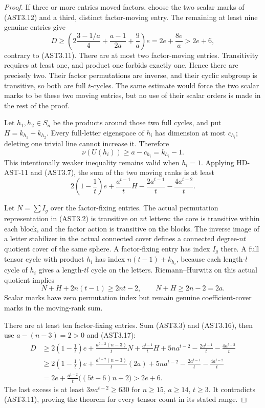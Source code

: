 \begin{proof}
If three or more entries moved factors, choose the two scalar
marks of (AST3.12) and a third, distinct factor-moving entry.
The remaining at least nine genuine entries give
\[
 D\ge\left(2\frac{3-1/a}{4}+\frac{a-1}{2a}
                         +\frac9a\right)e
       =2e+\frac{8e}{a}>2e+6,                               \tag{AST3.14}
\]
contrary to (AST3.11).  There are at most two factor-moving
entries.  Transitivity requires at least one, and product one
forbids exactly one.  Hence there are precisely two.  Their
factor permutations are inverse, and their cyclic subgroup is
transitive, so both are full $t$-cycles.  The same estimate would
force the two scalar marks to be these two moving entries, but
no use of their scalar orders is made in the rest of the proof.

Let $h_1,h_2\in S_n$ be the products around those two full
cycles, and put $H=k_{h_1}+k_{h_2}$.  Every full-letter
eigenspace of $h_i$ has dimension at most $c_{h_i}$; deleting
one trivial line cannot increase it.  Therefore
\[
                 \nu(U(h_i))\ge a-c_{h_i}=k_{h_i}-1.         \tag{AST3.15}
\]
This intentionally weaker inequality remains valid when $h_i=1$.
Applying HD-AST-11 and (AST3.7), the sum of the two moving
ranks is at least
\[
 2\left(1-\frac1t\right)e+\frac{a^{t-1}}tH
                  -\frac{2a^{t-1}}t-\frac{4a^{t-2}}t.        \tag{AST3.16}
\]

Let $N=\sum I_g$ over the factor-fixing entries.  The actual
permutation representation in (AST3.2) is transitive on $nt$
letters: the core is transitive within each block, and the
factor action is transitive on the blocks.  The inverse image of
a letter stabilizer in the actual connected cover defines a
connected degree-$nt$ quotient cover of the same sphere.
A factor-fixing entry has index $I_g$ there.  A full tensor
cycle with product $h_i$ has index $n(t-1)+k_{h_i}$, because
each length-$l$ cycle of $h_i$ gives a length-$tl$ cycle on
the letters.  Riemann--Hurwitz on this actual quotient implies
\[
               N+H+2n(t-1)\ge2nt-2,
               \qquad N+H\ge2n-2=2a.                       \tag{AST3.17}
\]
Scalar marks have zero permutation index but remain genuine
coefficient-cover marks in the moving-rank sum.

There are at least ten factor-fixing entries.  Sum (AST3.3)
and (AST3.16), then use $a-(n-3)=2>0$ and (AST3.17):
\[
\begin{split}
 D&\ge2\left(1-\frac1t\right)e
       +\frac{a^{t-2}(n-3)}tN+\frac{a^{t-1}}tH
       +5na^{t-2}-\frac{2a^{t-1}}t-\frac{4a^{t-2}}t\\
  &\ge2\left(1-\frac1t\right)e
       +\frac{a^{t-2}(n-3)}t(2a)
       +5na^{t-2}-\frac{2a^{t-1}}t-\frac{4a^{t-2}}t\\
  &=2e+\frac{a^{t-2}}t\bigl((5t-6)n+2\bigr)>2e+6.
\end{split}                                                   \tag{AST3.18}
\]
The last excess is at least $3na^{t-2}\ge630$ for
$n\ge15$, $a\ge14$, $t\ge3$.  It contradicts (AST3.11),
proving the theorem for every tensor count in its stated range.
\end{proof}

